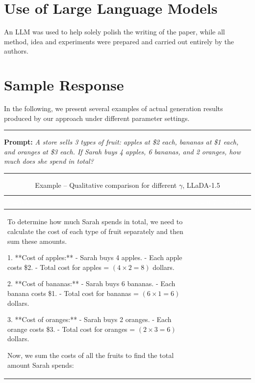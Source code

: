 \documentclass{article} %
\theoremstyle{definition}
\theoremstyle{remark}
\begin{document}
\section{Use of Large Language Models}

An LLM was used to help solely polish the writing of the paper, while all method, idea and experiments were prepared and carried out entirely by the authors.


\section{Sample Response}
In the following, we present several examples of actual generation results produced by our approach under different parameter settings.

\begin{table}[h]
\centering
\caption{Example -- Qualitative comparison for different $\gamma$, LLaDA-1.5}
\vspace{0.3cm}

\noindent\rule{\textwidth}{0.4pt}
\textbf{Prompt:} \textit{A store sells 3 types of fruit: apples at \$2 each, bananas at \$1 each, and oranges at \$3 each. If Sarah buys 4 apples, 6 bananas, and 2 oranges, how much does she spend in total?}
\noindent\rule{\textwidth}{0.4pt}

\vspace{0.5cm}

\begin{tabular}{|>{\columncolor{lightblue}}p{5cm}|>{\columncolor{lightgreen}}p{5cm}|>{\columncolor{lightpink}}p{5cm}|}
\hline
\rowcolor{headercolor}
\textcolor{white}{\textbf{$\gamma=0.5$}} & \textcolor{white}{\textbf{$\gamma=0.7$}} & \textcolor{white}{\textbf{$\gamma=0.95$}} \\
\hline
\footnotesize
To determine how much Sarah spends in total, we need to calculate the cost of each type of fruit separately and then sum these amounts.

1. **Cost of apples:**
   - Sarah buys 4 apples.
   - Each apple costs \$2.
   - Total cost for apples = $(4 \times 2 = 8)$ dollars.

2. **Cost of bananas:**
   - Sarah buys 6 bananas.
   - Each banana costs \$1.
   - Total cost for bananas = $(6 \times 1 = 6)$ dollars.

3. **Cost of oranges:**
   - Sarah buys 2 oranges.
   - Each orange costs \$3.
   - Total cost for oranges = $(2 \times 3 = 6)$ dollars.

Now, we sum the costs of all the fruits to find the total amount Sarah spends:


\end{tabular}
\end{table}
\end{document}
